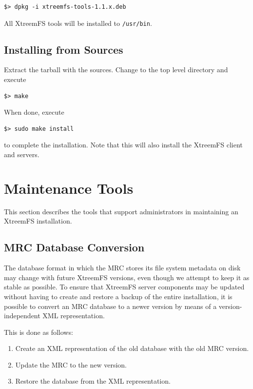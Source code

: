 \documentclass[a4paper,10pt]{book}
\begin{document}
\begin{verbatim}
$> dpkg -i xtreemfs-tools-1.1.x.deb
\end{verbatim}


All XtreemFS tools will be installed to \texttt{/usr/bin}.

\subsection{Installing from Sources}

Extract the tarball with the sources. Change to the top level directory and execute

\begin{verbatim}
$> make
\end{verbatim}

When done, execute

\begin{verbatim}
$> sudo make install
\end{verbatim}

to complete the installation. Note that this will also install the XtreemFS client and servers.

\section{Maintenance Tools}

This section describes the tools that support administrators in maintaining an XtreemFS installation.

\subsection{MRC Database Conversion}
\label{sec:mrcdbtools}

The database format in which the MRC stores its file system metadata on disk may change with future XtreemFS versions, even though we attempt to keep it as stable as possible. To ensure that XtreemFS server components may be updated without having to create and restore a backup of the entire installation, it is possible to convert an MRC database to a newer version by means of a version-independent XML representation.

This is done as follows:
\begin{enumerate}
  \item Create an XML representation of the old database with the old MRC version.
  \item Update the MRC to the new version.
  \item Restore the database from the XML representation.
\end{enumerate}
\end{document}
